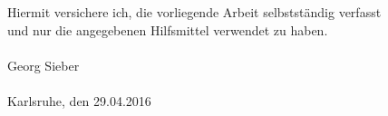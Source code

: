 \mbox{}\\
\vspace{15cm}
\\
Hiermit versichere ich, die vorliegende Arbeit selbstst\"andig verfasst\\
und nur die angegebenen Hilfsmittel verwendet zu haben.\\
\vspace{2cm}\\
Georg Sieber
\\
\\
Karlsruhe, den 29.04.2016
